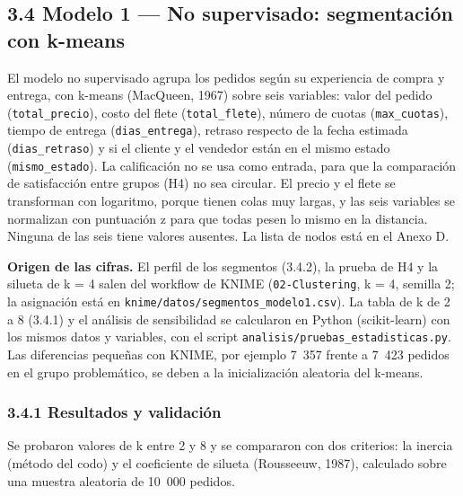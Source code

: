 \documentclass[a4paper,stu,12pt,donotrepeattitle,floatsintext]{apa7}
\begin{document}
\subsection{3.4 Modelo 1 — No supervisado: segmentación con k-means}
El modelo no supervisado agrupa los pedidos según su experiencia de compra y entrega, con k-means (MacQueen, 1967) sobre seis variables: valor del pedido (\texttt{total\_\allowbreak{}precio}), costo del flete (\texttt{total\_\allowbreak{}flete}), número de cuotas (\texttt{max\_\allowbreak{}cuotas}), tiempo de entrega (\texttt{dias\_\allowbreak{}entrega}), retraso respecto de la fecha estimada (\texttt{dias\_\allowbreak{}retraso}) y si el cliente y el vendedor están en el mismo estado (\texttt{mismo\_\allowbreak{}estado}). La calificación no se usa como entrada, para que la comparación de satisfacción entre grupos (H4) no sea circular. El precio y el flete se transforman con logaritmo, porque tienen colas muy largas, y las seis variables se normalizan con puntuación z para que todas pesen lo mismo en la distancia. Ninguna de las seis tiene valores ausentes. La lista de nodos está en el Anexo D.

\textbf{Origen de las cifras.} El perfil de los segmentos (3.4.2), la prueba de H4 y la silueta de k = 4 salen del workflow de KNIME (\texttt{02-Clustering}, k = 4, semilla 2; la asignación está en \texttt{knime/\allowbreak{}datos/\allowbreak{}segmentos\_\allowbreak{}modelo1.csv}). La tabla de k de 2 a 8 (3.4.1) y el análisis de sensibilidad se calcularon en Python (scikit-learn) con los mismos datos y variables, con el script \texttt{analisis/\allowbreak{}pruebas\_\allowbreak{}estadisticas.py}. Las diferencias pequeñas con KNIME, por ejemplo 7~357 frente a 7~423 pedidos en el grupo problemático, se deben a la inicialización aleatoria del k-means.

\subsubsection{3.4.1 Resultados y validación}
Se probaron valores de k entre 2 y 8 y se compararon con dos criterios: la inercia (método del codo) y el coeficiente de silueta (Rousseeuw, 1987), calculado sobre una muestra aleatoria de 10~000 pedidos.
\end{document}
